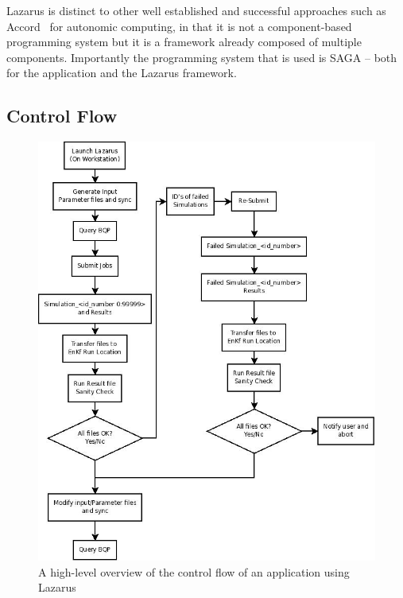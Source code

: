 \documentclass{sig-alternate}
\newcommand{\up}{\vspace*{-0.3em}}
\begin{document}
Lazarus is distinct to other well established and successful approaches such as Accord~\cite{accord} for autonomic computing, in that it is not a component-based programming system but it is a framework already composed of multiple components. Importantly the programming system that is used is SAGA -- both for the application and the Lazarus framework.

\up\up\up
\subsection{Control Flow}

\begin{figure}
\begin{center}
\includegraphics[scale=0.35]{./figures/Diagram1.jpeg}
\end{center}
\caption{A high-level overview of the control flow of an application using Lazarus}\up\up\up \up\up\up \up\up\up 
\label{fig:controlflow}
\end{figure}
\end{document}

